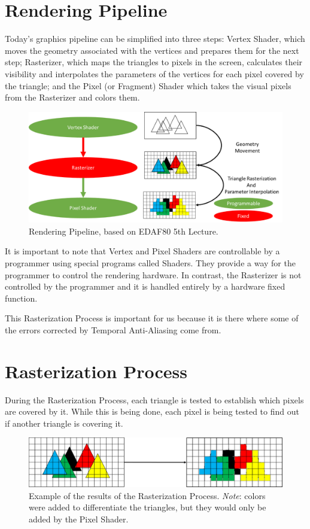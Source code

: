 \documentclass{cslthse-msc}
\begin{document}
\section{Rendering Pipeline}
Today’s graphics pipeline can be simplified into three steps: Vertex Shader, which moves the geometry associated with the vertices and prepares them for the next step; Rasterizer, which maps the triangles to pixels in the screen, calculates their visibility and interpolates the parameters of the vertices for each pixel covered by the triangle; and the Pixel (or Fragment) Shader which takes the visual pixels from the Rasterizer and colors them.

\begin{figure}[!hbt]
	\centering
	\includegraphics[scale=0.5]{images/graphics_pipeline.png} 
	\caption{Rendering Pipeline, based on EDAF80 5th Lecture.~\cite{Doggett2017EDAF80}}\label{fig:graphpipeline}
\end{figure}

It is important to note that Vertex and Pixel Shaders are controllable by a programmer using special programs called Shaders. They provide a way for the programmer to control the rendering hardware. In contrast, the Rasterizer is not controlled by the programmer and it is handled entirely by a hardware fixed function. \cite{Doggett2017EDAF80}

This Rasterization Process is important for us because it is there where some of the errors corrected by Temporal Anti-Aliasing come from.

\section{Rasterization Process}
During the Rasterization Process, each triangle is tested to establish which pixels are covered by it. While this is being done, each pixel is being tested to find out if another triangle is covering it.

\begin{figure}[!hbt]
	\centering
	\includegraphics[scale=0.75]{images/rasterization_process.png} 
	\caption{Example of the results of the Rasterization Process.
		\emph{Note}: colors were added to differentiate the triangles, but they would only be added by the Pixel Shader.
	}\label{fig:rasterizationproc}
\end{figure}
\end{document}

